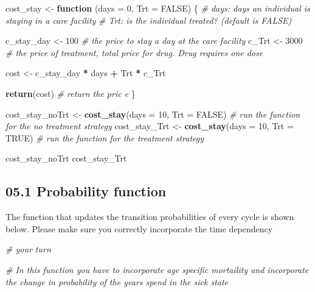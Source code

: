 \documentclass[
]{article}
\newenvironment{Shaded}{\begin{snugshade}}{\end{snugshade}}
\newcommand{\CommentTok}[1]{\textcolor[rgb]{0.56,0.35,0.01}{\textit{#1}}}
\newcommand{\ControlFlowTok}[1]{\textcolor[rgb]{0.13,0.29,0.53}{\textbf{#1}}}
\newcommand{\DataTypeTok}[1]{\textcolor[rgb]{0.13,0.29,0.53}{#1}}
\newcommand{\DecValTok}[1]{\textcolor[rgb]{0.00,0.00,0.81}{#1}}
\newcommand{\KeywordTok}[1]{\textcolor[rgb]{0.13,0.29,0.53}{\textbf{#1}}}
\newcommand{\NormalTok}[1]{#1}
\newcommand{\OperatorTok}[1]{\textcolor[rgb]{0.81,0.36,0.00}{\textbf{#1}}}
\newcommand{\OtherTok}[1]{\textcolor[rgb]{0.56,0.35,0.01}{#1}}
\newcommand{\StringTok}[1]{\textcolor[rgb]{0.31,0.60,0.02}{#1}}
\begin{document}
\begin{Shaded}
\begin{Highlighting}[]
\NormalTok{cost_stay <-}\StringTok{ }\ControlFlowTok{function}\NormalTok{ (}\DataTypeTok{days =} \DecValTok{0}\NormalTok{, }\DataTypeTok{Trt =} \OtherTok{FALSE}\NormalTok{) \{}
  \CommentTok{# days: days an individual is staying in a care facility}
  \CommentTok{# Trt:  is the individual treated? (default is FALSE) }
  
\NormalTok{  c_stay_day <-}\StringTok{ }\DecValTok{100}   \CommentTok{# the price to stay a day at the care facility}
\NormalTok{  c_Trt <-}\StringTok{ }\DecValTok{3000}       \CommentTok{# the price of treatment, total price for drug. Drug requires one dose}
  
\NormalTok{  cost <-}\StringTok{ }\NormalTok{c_stay_day }\OperatorTok{*}\StringTok{ }\NormalTok{days }\OperatorTok{+}\StringTok{ }\NormalTok{Trt }\OperatorTok{*}\StringTok{ }\NormalTok{c_Trt}

  \KeywordTok{return}\NormalTok{(cost)       }\CommentTok{# return the pric e}
\NormalTok{\}}

\NormalTok{cost_stay_noTrt <-}\StringTok{ }\KeywordTok{cost_stay}\NormalTok{(}\DataTypeTok{days =} \DecValTok{10}\NormalTok{, }\DataTypeTok{Trt =} \OtherTok{FALSE}\NormalTok{) }\CommentTok{# run the function for the no treatment strategy}
\NormalTok{cost_stay_Trt   <-}\StringTok{ }\KeywordTok{cost_stay}\NormalTok{(}\DataTypeTok{days =} \DecValTok{10}\NormalTok{, }\DataTypeTok{Trt =} \OtherTok{TRUE}\NormalTok{) }\CommentTok{# run the function for the treatment strategy}

\NormalTok{cost_stay_noTrt}
\NormalTok{cost_stay_Trt}
\end{Highlighting}
\end{Shaded}

\hypertarget{probability-function}{%
\subsection{05.1 Probability function}\label{probability-function}}

The function that updates the transition probabilities of every cycle is
shown below. Please make sure you correctly incorporate the time
dependency

\begin{Shaded}
\begin{Highlighting}[]
\CommentTok{# your turn}

\CommentTok{# In this function you have to incorporate age specific mortaility and incorporate the change in probability of the years spend in the sick state}
\end{Highlighting}
\end{Shaded}
\end{document}
